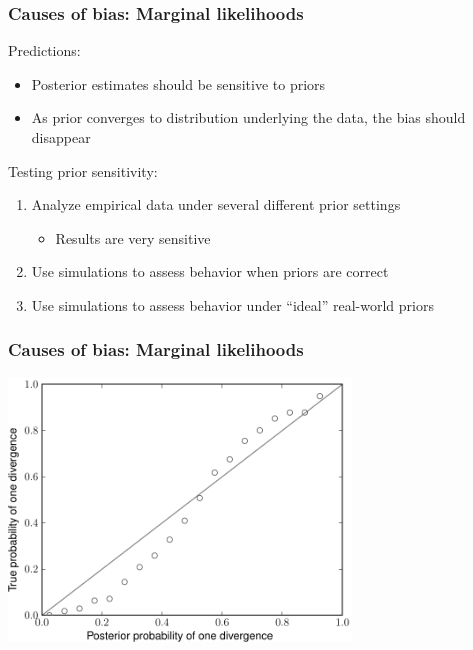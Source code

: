 \begin{frame}
    \frametitle{Causes of bias: Marginal likelihoods}
    Predictions:\\
    \begin{itemize}
        \item Posterior estimates should be sensitive to priors
        \item As prior converges to distribution underlying the data, the
            bias should disappear
    \end{itemize}
    Testing prior sensitivity: \\
    \begin{enumerate}
        \item Analyze empirical data under several different prior settings
            \begin{itemize}
                \item Results are very sensitive
            \end{itemize}
        \item Use simulations to assess behavior when priors are correct
        \item Use simulations to assess behavior under ``ideal'' real-world priors
    \end{enumerate}
\end{frame}

\begin{frame}
    \frametitle{Causes of bias: Marginal likelihoods}
    \centerline{
    \includegraphics[height=7.0cm]{images/validation-model-choice-old.pdf}}
\end{frame}

